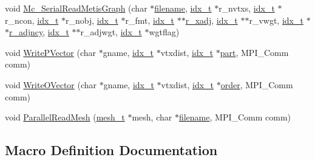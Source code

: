 \begin{DoxyCompactItemize}
\item 
void \hyperlink{a00861_ab618501d6d645eabdbe89cc62d33a54f}{Mc\+\_\+\+Serial\+Read\+Metis\+Graph} (char $\ast$\hyperlink{a00623_a42a21beb8018ac623f4d09db1343b9cf}{filename}, \hyperlink{a00876_aaa5262be3e700770163401acb0150f52}{idx\+\_\+t} $\ast$r\+\_\+nvtxs, \hyperlink{a00876_aaa5262be3e700770163401acb0150f52}{idx\+\_\+t} $\ast$r\+\_\+ncon, \hyperlink{a00876_aaa5262be3e700770163401acb0150f52}{idx\+\_\+t} $\ast$r\+\_\+nobj, \hyperlink{a00876_aaa5262be3e700770163401acb0150f52}{idx\+\_\+t} $\ast$r\+\_\+fmt, \hyperlink{a00876_aaa5262be3e700770163401acb0150f52}{idx\+\_\+t} $\ast$$\ast$\hyperlink{a00879_ab92af26e448291b7932687dee45298df}{r\+\_\+xadj}, \hyperlink{a00876_aaa5262be3e700770163401acb0150f52}{idx\+\_\+t} $\ast$$\ast$r\+\_\+vwgt, \hyperlink{a00876_aaa5262be3e700770163401acb0150f52}{idx\+\_\+t} $\ast$$\ast$\hyperlink{a00879_ad0152ea85617e06eb0e2d9f386150411}{r\+\_\+adjncy}, \hyperlink{a00876_aaa5262be3e700770163401acb0150f52}{idx\+\_\+t} $\ast$$\ast$r\+\_\+adjwgt, \hyperlink{a00876_aaa5262be3e700770163401acb0150f52}{idx\+\_\+t} $\ast$wgtflag)
\item 
void \hyperlink{a00861_a19b5376612558b2381990f2e7a06bffc}{Write\+P\+Vector} (char $\ast$gname, \hyperlink{a00876_aaa5262be3e700770163401acb0150f52}{idx\+\_\+t} $\ast$vtxdist, \hyperlink{a00876_aaa5262be3e700770163401acb0150f52}{idx\+\_\+t} $\ast$\hyperlink{a00879_a0a9ea8670f88d6db1e021fee2dcd94be}{part}, M\+P\+I\+\_\+\+Comm comm)
\item 
void \hyperlink{a00861_a9ff4864d8e906761bd6c55597c085e3b}{Write\+O\+Vector} (char $\ast$gname, \hyperlink{a00876_aaa5262be3e700770163401acb0150f52}{idx\+\_\+t} $\ast$vtxdist, \hyperlink{a00876_aaa5262be3e700770163401acb0150f52}{idx\+\_\+t} $\ast$\hyperlink{a00611_aab21ede0c02820806e77fd7890ee6bd7}{order}, M\+P\+I\+\_\+\+Comm comm)
\item 
void \hyperlink{a00861_a2c53ca97c8a99924f3bbaa8fbd050b8c}{Parallel\+Read\+Mesh} (\hyperlink{a00738}{mesh\+\_\+t} $\ast$mesh, char $\ast$\hyperlink{a00623_a42a21beb8018ac623f4d09db1343b9cf}{filename}, M\+P\+I\+\_\+\+Comm comm)
\end{DoxyCompactItemize}


\subsection{Macro Definition Documentation}
\mbox{\label{a00861_a3e937c42922f7601edb17b747602c471}} 

